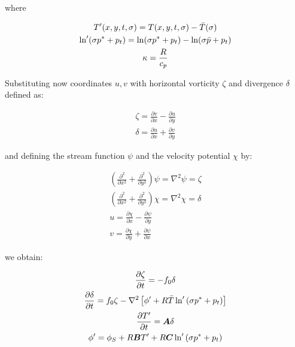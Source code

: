 where

\begin{gather}
  T^{\prime}(x,y,t,\sigma) = T(x,y,t,\sigma) -
     \bar{T}(\sigma) \nonumber \\
  \ln^{\prime}(\sigma p^{\ast} + p_t) = \ln(\sigma p^{\ast} + p_t) -
    \ln(\sigma \bar{p} + p_t) \nonumber \\
  \kappa = \frac{R}{c_p} \nonumber
\end{gather}

Substituting now coordinates $u,v$ with horizontal vorticity $\zeta$ and
divergence $\delta$ defined as:

\begin{gather}
  \label{vorticity}
  \zeta = \frac{\partial v}{\partial x} -
          \frac{\partial u}{\partial y} \\
  \label{divergence}
        \delta = \frac{\partial u}{\partial x} +
                 \frac{\partial v}{\partial y}
\end{gather}

and defining the stream function $\psi$ and the velocity potential $\chi$
by:

\begin{gather}
  \left(\frac{\partial^2}{\partial x^2} +
        \frac{\partial^2}{\partial y^2}\right) \psi = 
        \nabla^2 \psi = \zeta \\
  \left(\frac{\partial^2}{\partial x^2} +
        \frac{\partial^2}{\partial y^2}\right) \chi = 
        \nabla ^2 \chi = \delta \\
  u = \frac{\partial \chi}{\partial x} -
      \frac{\partial \psi}{\partial y} \\
  v = \frac{\partial \chi}{\partial y} +
      \frac{\partial \psi}{\partial x}
\end{gather}

we obtain:

\begin{gather}
  \frac{\partial \zeta}{\partial t} = -f_0 \delta \\
  \frac{\partial \delta}{\partial t} = f_0 \zeta -
    \nabla^2\left[\phi^{\prime} + R \bar{T}
    \ln^{\prime}\left(\sigma p^{\ast} + p_t\right)\right] \\
  \label{2124}
  \frac{\partial T^{\prime}}{\partial t} = \bm{A} \delta \\
  \label{2125}
  \phi^{\prime} = \phi_S + R \bm{B} T^{\prime} +
      R \bm{C} \ln^{\prime} \left(\sigma p^{\ast} + p_t\right)
\end{gather}

